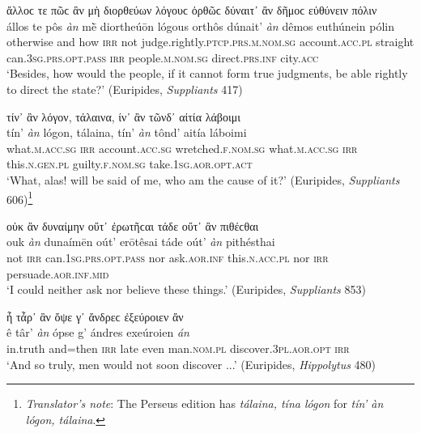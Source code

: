 \begin{exe}
\ex ἄλλοϲ τε πῶϲ ἂν μὴ διορθεύων λόγουϲ ὀρθῶϲ δύναιτ᾽ ἂν δῆμοϲ εὐθύνειν πόλιν\\
\gll állos te pôs \emph{àn} mḕ diortheúōn lógous orthôs dúnait' \emph{àn} dêmos euthúnein pólin\\
otherwise and how \textsc{irr} not judge.rightly.\textsc{ptcp.prs.m.nom.sg} account.\textsc{acc.pl} straight can.\textsc{3sg.prs.opt.pass} \textsc{irr} people.\textsc{m.nom.sg} direct.\textsc{prs.inf} city.\textsc{acc}\\
\trans `Besides, how would the people, if it cannot form true judgments, be able rightly to direct the state?' (Euripides, \textit{Suppliants} 417)
\label{multian30}
\end{exe}

\begin{exe}
\ex τίν᾽ ἂν λόγον, τάλαινα, ίν᾽ ἂν τῶνδ᾽ αἰτία λάβοιμι\\
\gll tín' \emph{àn} lógon, tálaina, tín' \emph{àn} tônd' aitía láboimi\\
what.\textsc{m.acc.sg} \textsc{irr} account.\textsc{acc.sg} wretched.\textsc{f.nom.sg} what.\textsc{m.acc.sg} \textsc{irr} this.\textsc{n.gen.pl} guilty.\textsc{f.nom.sg} take.\textsc{1sg.aor.opt.act}\\
\trans `What, alas! will be said of me, who am the cause of it?' (Euripides, \textit{Suppliants} 606)\footnote{\emph{Translator's note}: The Perseus edition has \textit{tálaina, tína lógon} for \textit{tín' àn lógon, tálaina}.}
\label{multian31}
\end{exe}

\begin{exe}
\ex οὐκ ἂν δυναίμην οὔτ᾽ ἐρωτῆϲαι τάδε οὔτ᾽ ἂν πιθέϲθαι\\
\gll ouk \emph{àn} dunaímēn oút' erōtêsai táde oút' \emph{àn} pithésthai\\
not \textsc{irr} can.\textsc{1sg.prs.opt.pass} nor ask.\textsc{aor.inf} this.\textsc{n.acc.pl} nor \textsc{irr} persuade.\textsc{aor.inf.mid}\\
\trans `I could neither ask nor believe these things.' (Euripides, \textit{Suppliants} 853)
\label{multian32}
\end{exe}

\begin{exe}
\ex ἦ τἆρ᾽ ἂν ὄψε γ᾽ ἄνδρεϲ ἐξεύροιεν ἄν\\
\gll ê târ' \emph{àn} ópse g' ándres exeúroien \emph{án}\\
in.truth and=then \textsc{irr} late even man.\textsc{nom.pl} discover.\textsc{3pl.aor.opt} \textsc{irr}\\
\trans `And so truly, men would not soon discover ...' (Euripides, \textit{Hippolytus} 480)
\label{multian33}
\end{exe}

